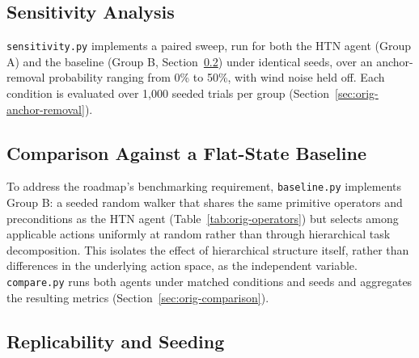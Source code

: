 \subsection{Sensitivity Analysis}
\label{sec:orig-sensitivity}

\texttt{sensitivity.py} implements a paired sweep, run for both the HTN agent (Group A) and the baseline (Group B, Section~\ref{sec:orig-baseline}) under identical seeds, over an anchor-removal probability ranging from 0\% to 50\%, with wind noise held off. Each condition is evaluated over 1,000 seeded trials per group (Section~\ref{sec:orig-anchor-removal}).

\subsection{Comparison Against a Flat-State Baseline}
\label{sec:orig-baseline}

To address the roadmap's benchmarking requirement, \texttt{baseline.py} implements Group B: a seeded random walker that shares the same primitive operators and preconditions as the HTN agent (Table~\ref{tab:orig-operators}) but selects among applicable actions uniformly at random rather than through hierarchical task decomposition. This isolates the effect of hierarchical structure itself, rather than differences in the underlying action space, as the independent variable. \texttt{compare.py} runs both agents under matched conditions and seeds and aggregates the resulting metrics (Section~\ref{sec:orig-comparison}).

\subsection{Replicability and Seeding}
\label{sec:orig-seeding}

